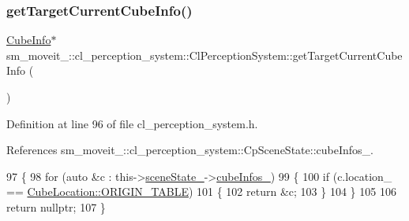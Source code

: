 \subsubsection{\texorpdfstring{get\+Target\+Current\+Cube\+Info()}{getTargetCurrentCubeInfo()}}
{\footnotesize\ttfamily \hyperlink{structsm__moveit__4_1_1cl__perception__system_1_1CubeInfo}{Cube\+Info}$\ast$ sm\+\_\+moveit\+\_\+::cl\+\_\+perception\+\_\+system\+::\+Cl\+Perception\+System\+::get\+Target\+Current\+Cube\+Info (\begin{DoxyParamCaption}{ }\end{DoxyParamCaption})\hspace{0.3cm}{\ttfamily [inline]}}



Definition at line 96 of file cl\+\_\+perception\+\_\+system.\+h.



References sm\+\_\+moveit\+\_\+::cl\+\_\+perception\+\_\+system\+::\+Cp\+Scene\+State\+::cube\+Infos\+\_\+.


\begin{DoxyCode}
97             \{
98                 \textcolor{keywordflow}{for} (\textcolor{keyword}{auto} &c : this->\hyperlink{classsm__moveit__4_1_1cl__perception__system_1_1ClPerceptionSystem_a82ea8feeb2fa43349f91ed59137b3890}{sceneState\_}->\hyperlink{classsm__moveit__4_1_1cl__perception__system_1_1CpSceneState_a734a45934cccf19ac5c886cd94bc8cda}{cubeInfos\_})
99                 \{
100                     \textcolor{keywordflow}{if} (c.location\_ == \hyperlink{namespacesm__moveit__4_1_1cl__perception__system_a0d1b8834532a7cf9d19670791eece6d1ae5ee34c3ef8ec4a46a00a218416c7b1d}{CubeLocation::ORIGIN\_TABLE})
101                     \{
102                         \textcolor{keywordflow}{return} &c;
103                     \}
104                 \}
105 
106                 \textcolor{keywordflow}{return} \textcolor{keyword}{nullptr};
107             \}
\end{DoxyCode}
\mbox{\label{classsm__moveit__4_1_1cl__perception__system_1_1ClPerceptionSystem_a84da4b68fddd1b2c81d69d5f7aafeb94}} 
